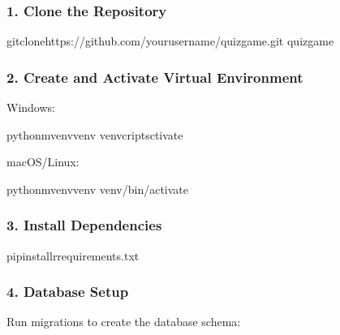 \documentclass[letterpaper,10pt,english]{sphinxmanual}
\begin{document}
\subsubsection{1. Clone the Repository}
\label{\detokenize{installation:clone-the-repository}}
\begin{sphinxVerbatim}[commandchars=\\\{\}]
gitclonehttps://github.com/yourusername/quiz\PYGZhy{}game.git
quiz\PYGZhy{}game
\end{sphinxVerbatim}


\subsubsection{2. Create and Activate Virtual Environment}
\label{\detokenize{installation:create-and-activate-virtual-environment}}
\sphinxAtStartPar
Windows:

\begin{sphinxVerbatim}[commandchars=\\\{\}]
python\PYGZhy{}mvenvvenv
venvcriptsctivate
\end{sphinxVerbatim}

\sphinxAtStartPar
macOS/Linux:

\begin{sphinxVerbatim}[commandchars=\\\{\}]
python\PYGZhy{}mvenvvenv
venv/bin/activate
\end{sphinxVerbatim}


\subsubsection{3. Install Dependencies}
\label{\detokenize{installation:install-dependencies}}
\begin{sphinxVerbatim}[commandchars=\\\{\}]
pipinstall\PYGZhy{}rrequirements.txt
\end{sphinxVerbatim}


\subsubsection{4. Database Setup}
\label{\detokenize{installation:database-setup}}
\sphinxAtStartPar
Run migrations to create the database schema:
\end{document}
